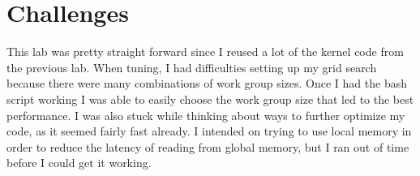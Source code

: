 \documentclass[12pt]{article}
\begin{document}
\section{Challenges}

This lab was pretty straight forward since I reused a lot of the kernel code from the previous lab.
When tuning, I had difficulties setting up my grid search because there were many combinations of work group sizes.
Once I had the bash script working I was able to easily choose the work group size that led to the best performance.
I was also stuck while thinking about ways to further optimize my code, as it seemed fairly fast already. I
intended on trying to use local memory in order to reduce the latency of reading from global memory, but I ran
out of time before I could get it working.
\end{document}
